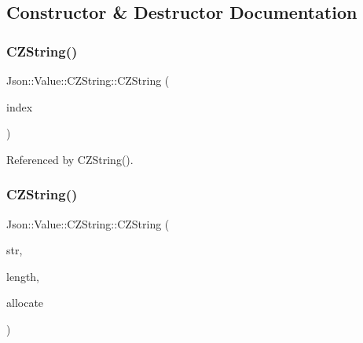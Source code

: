 \subsection{Constructor \& Destructor Documentation}
\mbox{\label{classJson_1_1Value_1_1CZString_a4b8aa6eaabdec78cffec96e088da996f_a4b8aa6eaabdec78cffec96e088da996f}} 
\subsubsection{\texorpdfstring{C\+Z\+String()}{CZString()}\hspace{0.1cm}{\footnotesize\ttfamily [1/3]}}
{\footnotesize\ttfamily Json\+::\+Value\+::\+C\+Z\+String\+::\+C\+Z\+String (\begin{DoxyParamCaption}\item[{\hyperlink{classJson_1_1Value_a184a91566cccca7b819240f0d5561c7d_a184a91566cccca7b819240f0d5561c7d}{Array\+Index}}]{index }\end{DoxyParamCaption})}



Referenced by C\+Z\+String().

\mbox{\label{classJson_1_1Value_1_1CZString_a86a86eaf0cf26d4c861d0daa359d608a_a86a86eaf0cf26d4c861d0daa359d608a}} 
\subsubsection{\texorpdfstring{C\+Z\+String()}{CZString()}\hspace{0.1cm}{\footnotesize\ttfamily [2/3]}}
{\footnotesize\ttfamily Json\+::\+Value\+::\+C\+Z\+String\+::\+C\+Z\+String (\begin{DoxyParamCaption}\item[{char const $\ast$}]{str,  }\item[{unsigned}]{length,  }\item[{\hyperlink{classJson_1_1Value_1_1CZString_a2805c46fb4a72bbaed55de6d75941b6d_a2805c46fb4a72bbaed55de6d75941b6d}{Duplication\+Policy}}]{allocate }\end{DoxyParamCaption})}



